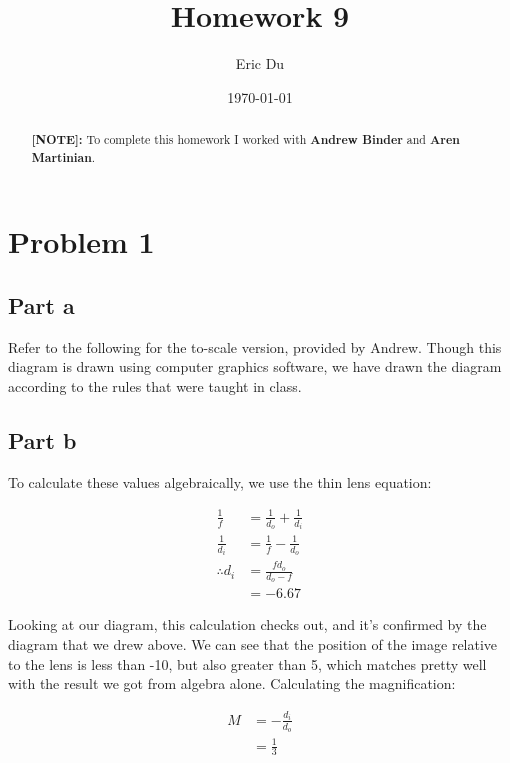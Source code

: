 \documentclass{article}
\title{Homework 9}
\author{Eric Du}
\date{\today}
\theoremstyle{definition}
\numberwithin{equation}{section}
\numberwithin{definition}{section}
\begin{document}
\maketitle


\begin{abstract}
\noindent \textbf{[NOTE]:} To complete this homework I worked with \textbf{Andrew Binder} and \textbf{Aren Martinian}.
\end{abstract}


\section{Problem 1}


\subsection*{Part a}

Refer to the following for the to-scale version, provided by Andrew. Though this diagram is drawn using computer graphics software, we have drawn the diagram according to the rules that were taught in class. 



\subsection*{Part b}

To calculate these values algebraically, we use the thin lens equation:

\begin{align*}
    \frac{1}{f} &= \frac{1}{d_o} + \frac{1}{d_i}\\
    \frac{1}{d_i} &= \frac{1}{f} - \frac{1}{d_o}\\
    \therefore d_i &= \frac{fd_o}{d_o - f}\\
    &= -6.67
\end{align*}

Looking at our diagram, this calculation checks out, and it's confirmed by the diagram that we drew above. We can see that the position of the image relative to the lens is less than -10, but also greater than 5, which matches pretty well with the result we got from algebra alone. Calculating the magnification:

\begin{align*}
    M &= -\frac{d_i}{d_o}\\
    &= \frac{1}{3}
\end{align*}
\end{document}
